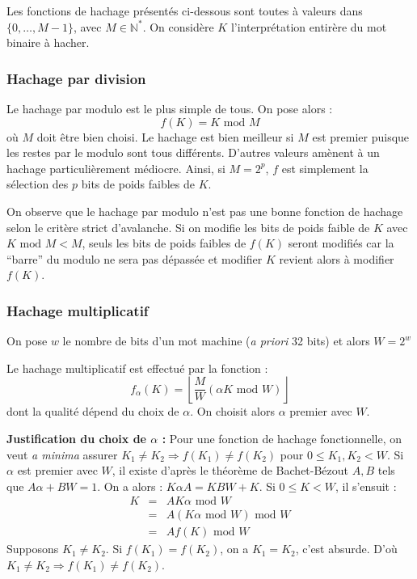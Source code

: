 \documentclass[../../../main.tex]{subfiles}
\begin{document}
Les fonctions de hachage présentés ci-dessous sont toutes à valeurs dans $\{0, \dots, M-1\}$, avec $M\in{\mathbb{N}^*}$. On considère $K$ l'interprétation entirère du mot binaire à hacher.
\subsubsection{Hachage par division}
Le hachage par modulo est le plus simple de tous.  On pose alors :
$$f(K) = K\text{ mod } M$$
où $M$ doit être bien choisi. Le hachage est bien meilleur si $M$ est premier puisque les restes par le modulo sont tous différents. D'autres valeurs amènent à un hachage particulièrement médiocre. Ainsi, si $M = 2^p$, $f$ est simplement la sélection des $p$ bits de poids faibles de $K$.

On observe que le hachage par modulo n'est pas une bonne fonction de hachage selon le critère strict d'avalanche. Si on modifie les bits de poids faible de $K$ avec $K\text{ mod }M < M$, seuls les bits de poids faibles de $f(K)$ seront modifiés car la ``barre'' du modulo ne sera pas dépassée et modifier $K$ revient alors à modifier $f(K)$.
\subsubsection{Hachage multiplicatif}
On pose $w$ le nombre de bits d'un mot machine (\textit{a priori} 32 bits) et alors $W = 2^w$

Le hachage multiplicatif est effectué par la fonction :
$$f_\alpha(K) = \left\lfloor\dfrac{M}{W}(\alpha K\text{ mod }W)\right\rfloor$$
dont la qualité dépend du choix de $\alpha$. On choisit alors $\alpha$ premier avec $W$.

\textbf{Justification du choix de $\alpha$ :} Pour une fonction de hachage fonctionnelle, on veut \textit{a minima} assurer $K_1\neq K_2\Rightarrow f(K_1)\neq f(K_2)$ pour $0 \leq K_1, K_2 < W$. Si $\alpha$ est premier avec $W$, il existe d'après le théorème de Bachet-Bézout $A, B$ tels que $A\alpha + BW = 1$. On a alors : $K\alpha A = KBW + K$.\newline
Si $0\leq K < W$, il s'ensuit :
$$\begin{array}{lcll}
K & = & AK\alpha \text{ mod }W \\
  & = & A(K\alpha\text{ mod }W)\text{ mod }W \\
  & = & Af(K)\text{ mod } W\end{array}$$
Supposons $K_1\neq K_2$. Si $f(K_1) = f(K_2)$, on a $K_1 = K_2$, c'est absurde.\newline
D'où $K_1 \neq K_2 \Rightarrow f(K_1)\neq f(K_2)$.
\end{document}
